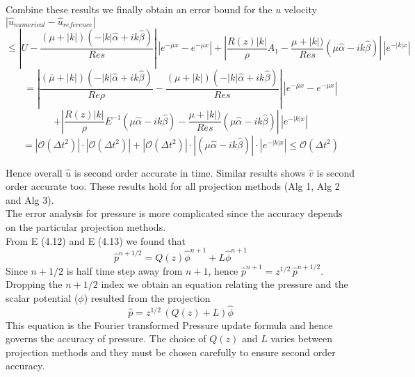 Combine these results we finally obtain an error bound for the $u$ velocity\\

$| \hat{u}_{numerical} - \hat{u}_{reference} | $
\begin{equation*}
\leq |U - \dfrac{(\mu + |k|) (-|k| \hat{\alpha} + ik \hat{\beta})}{Re s}| \, |e^{-\bar{\mu} x} - e^{-\mu x} | + | \dfrac{R(z) |k|}{\rho} A_1 - \dfrac{\mu + |k|)}{Re s} (\mu \hat{\alpha} - ik \hat{\beta}) | \, |e^{- |k|x}|
\end{equation*}
\begin{equation*}
= | \dfrac{(\bar{\mu} + |k|) (-|k| \hat{\alpha} + ik \hat{\beta})}{Re \rho} - \dfrac{(\mu + |k|) (-|k| \hat{\alpha} + ik \hat{\beta})}{Re s} |\, |e^{-\bar{\mu} x} - e^{-\mu x} | 
\end{equation*}
\begin{equation*}
+ | \dfrac{R(z) |k|}{\rho} E^{-1} (\mu \hat{\alpha} - ik \hat{\beta}) - \dfrac{\mu + |k|)}{Re s} (\mu \hat{\alpha} - ik \hat{\beta}) | \, |e^{- |k|x}|
\end{equation*}
\begin{equation*}
= | \mathcal{O} (\Delta t^2) |\cdot |\mathcal{O} (\Delta t^2)| + |\mathcal{O} (\Delta t^2)| \cdot| (\mu \hat{\alpha} - ik \hat{\beta}) | \cdot |e^{- |k|x}|
\leq \mathcal{O} (\Delta t^2) 
\end{equation*}

Hence overall $\hat{u}$ is second order accurate in time. Similar results shows $\hat{v}$ is second order accurate too. These results hold for all projection methods (Alg 1, Alg 2 and Alg 3).\\

The error analysis for pressure is more complicated since the accuracy depends on the particular projection methods.\\

From E (4.12) and E (4.13) we found that
\begin{equation*}
\hat{p}^{n+1/2} = Q(z)\hat{\phi}^{n+1} + L\hat{\phi}^{n+1}
\end{equation*}
Since $n + 1/2$ is half time step away from $n+1$, hence $\hat{p}^{n+1} = z^{1/2} \, \hat{p}^{n+1/2}$. Dropping the $n+1/2$ index we obtain an equation relating the pressure and the scalar potential ($\phi$) resulted from the projection\\
\begin{equation}
\hat{p} = z^{1/2} \, (Q(z) + L)\hat{\phi}
\end{equation}
This equation is the Fourier transformed Pressure update formula and hence governs the accuracy of pressure. The choice of $Q(z)$ and $L$ varies between projection methods and they must be chosen carefully to ensure second order accuracy.\\

